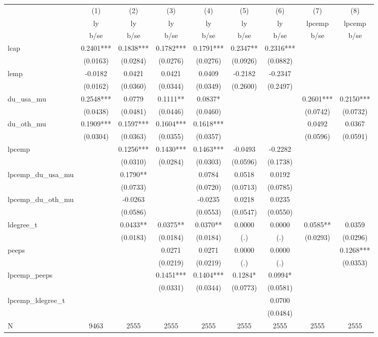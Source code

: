 \begin{adjustbox}{max width=\textwidth}
\begin{tabular}{lcccccccc}
\toprule
 & (1) & (2) & (3) & (4) & (5) & (6) & (7) & (8) \\
 & ly & ly & ly & ly & ly & ly & lpcemp & lpcemp \\
 & b/se & b/se & b/se & b/se & b/se & b/se & b/se & b/se \\
\midrule
lcap & 0.2401*** & 0.1838*** & 0.1782*** & 0.1791*** & 0.2347** & 0.2316*** &  &  \\
 & (0.0163) & (0.0284) & (0.0276) & (0.0276) & (0.0926) & (0.0882) &  &  \\
lemp & -0.0182 & 0.0421 & 0.0421 & 0.0409 & -0.2182 & -0.2347 &  &  \\
 & (0.0162) & (0.0360) & (0.0344) & (0.0349) & (0.2600) & (0.2497) &  &  \\
du\_usa\_mu & 0.2548*** & 0.0779 & 0.1111** & 0.0837* &  &  & 0.2601*** & 0.2150*** \\
 & (0.0438) & (0.0481) & (0.0446) & (0.0460) &  &  & (0.0742) & (0.0732) \\
du\_oth\_mu & 0.1909*** & 0.1597*** & 0.1604*** & 0.1618*** &  &  & 0.0492 & 0.0367 \\
 & (0.0304) & (0.0363) & (0.0355) & (0.0357) &  &  & (0.0596) & (0.0591) \\
lpcemp &  & 0.1256*** & 0.1430*** & 0.1463*** & -0.0493 & -0.2282 &  &  \\
 &  & (0.0310) & (0.0284) & (0.0303) & (0.0596) & (0.1738) &  &  \\
lpcemp\_du\_usa\_mu &  & 0.1790** &  & 0.0784 & 0.0518 & 0.0192 &  &  \\
 &  & (0.0733) &  & (0.0720) & (0.0713) & (0.0785) &  &  \\
lpcemp\_du\_oth\_mu &  & -0.0263 &  & -0.0235 & 0.0218 & 0.0235 &  &  \\
 &  & (0.0586) &  & (0.0553) & (0.0547) & (0.0550) &  &  \\
ldegree\_t &  & 0.0433** & 0.0375** & 0.0370** & 0.0000 & 0.0000 & 0.0585** & 0.0359 \\
 &  & (0.0183) & (0.0184) & (0.0184) & (.) & (.) & (0.0293) & (0.0296) \\
peeps &  &  & 0.0271 & 0.0271 & 0.0000 & 0.0000 &  & 0.1268*** \\
 &  &  & (0.0219) & (0.0219) & (.) & (.) &  & (0.0353) \\
lpcemp\_peeps &  &  & 0.1451*** & 0.1404*** & 0.1284* & 0.0994* &  &  \\
 &  &  & (0.0331) & (0.0344) & (0.0773) & (0.0581) &  &  \\
lpcemp\_ldegree\_t &  &  &  &  &  & 0.0700 &  &  \\
 &  &  &  &  &  & (0.0484) &  &  \\
\midrule
N & 9463 & 2555 & 2555 & 2555 & 2555 & 2555 & 2555 & 2555 \\
\bottomrule
\end{tabular}
\end{adjustbox}
